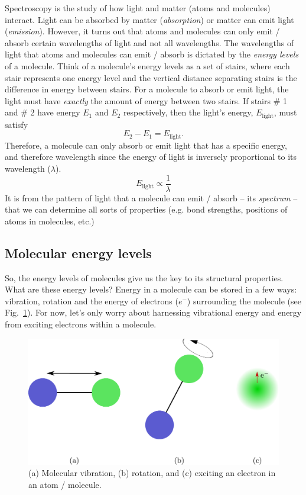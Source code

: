 \documentclass[12pt]{article}
\begin{document}
Spectroscopy is the study of how light and matter (atoms and molecules) interact. 
Light can be absorbed by matter (\textit{absorption}) or matter can emit light (\textit{emission}). 
However, it turns out that atoms and molecules can only emit / absorb certain wavelengths of light and not all wavelengths. 
The wavelengths of light that atoms and molecules can emit / absorb is dictated by the \textit{energy levels} of a molecule.
Think of a molecule's energy levels as a set of stairs, where each stair represents one energy level and the vertical distance separating stairs is the difference in energy between stairs. 
For a molecule to absorb or emit light, the light must have \textit{exactly} the amount of energy between two stairs. 
If stairs \# 1 and \# 2 have energy $E_1$ and $E_2$ respectively, then the light's energy, $E_{\text{light}}$, must satisfy
\begin{equation}
    E_2 - E_1 = E_{\text{light}}.
\end{equation}
Therefore, a molecule can only absorb or emit light that has a specific energy, and therefore wavelength since the energy of light is inversely proportional to its wavelength ($\lambda$).
\begin{equation}
    E_{\text{light}} \propto \frac{1}{\lambda}
\end{equation}
It is from the pattern of light that a molecule can emit / absorb -- its \textit{spectrum} -- that we can determine all sorts of properties (e.g. bond strengths, positions of atoms in molecules, etc.)

\subsection{Molecular energy levels}

So, the energy levels of molecules give us the key to its structural properties. What are these energy levels? Energy in a molecule can be stored in a few ways: vibration, rotation and the energy of electrons ($e^-$) surrounding the molecule (see Fig.~\ref{fig:DOFs}). For now, let's only worry about harnessing vibrational energy and energy from exciting electrons within a molecule.

\begin{figure}
    \begin{center}
        \includegraphics[width=0.5\linewidth]{figures/molecule_DOFs.pdf}
    \end{center}
    \caption{
    (a) Molecular vibration, (b) rotation, and (c) exciting an electron in an atom / molecule.
    }
    \label{fig:DOFs}
\end{figure}
\end{document}
